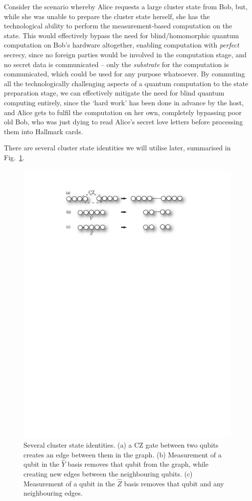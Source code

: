 \documentclass[aps,rmp,twocolumn,amsmath,amssymb,nofootinbib,superscriptaddress]{revtex4}
\begin{document}
Consider the scenario whereby Alice requests a large cluster state from Bob, but, while she was unable to prepare the cluster state herself, she has the technological ability to perform the measurement-based computation on the state. This would effectively bypass the need for blind/homomorphic quantum computation on Bob's hardware altogether, enabling computation with \emph{perfect} secrecy, since no foreign parties would be involved in the computation stage, and no secret data is communicated -- only the \emph{substrate} for the computation is communicated, which could be used for any purpose whatsoever. By commuting all the technologically challenging aspects of a quantum computation to the state preparation stage, we can effectively mitigate the need for blind quantum computing entirely, since the `hard work' has been done in advance by the host, and Alice gets to fulfil the computation on her own, completely bypassing poor old Bob, who was just dying to read Alice's secret love letters before processing them into Hallmark cards.

There are several cluster state identities we will utilise later, summarised in Fig.~\ref{fig:cluster_ident}.

\begin{figure}[!htb]
\includegraphics[width=\columnwidth]{cluster_identities}
\caption{Several cluster state identities. (a) a CZ gate between two qubits creates an edge between them in the graph. (b) Measurement of a qubit in the $\hat{Y}$ basis removes that qubit from the graph, while creating new edges between the neighbouring qubits. (c) Measurement of a qubit in the $\hat{Z}$ basis removes that qubit and any neighbouring edges.} \label{fig:cluster_ident} 
\end{figure}
\end{document}
